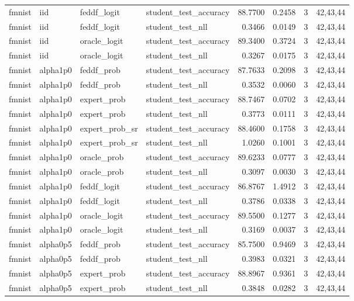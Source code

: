 \begin{tabular}{llllrrrl}
fmnist & iid & feddf\_logit & student\_test\_accuracy & 88.7700 & 0.2458 & 3 & 42,43,44 \\
fmnist & iid & feddf\_logit & student\_test\_nll & 0.3466 & 0.0149 & 3 & 42,43,44 \\
fmnist & iid & oracle\_logit & student\_test\_accuracy & 89.3400 & 0.3724 & 3 & 42,43,44 \\
fmnist & iid & oracle\_logit & student\_test\_nll & 0.3267 & 0.0175 & 3 & 42,43,44 \\
fmnist & alpha1p0 & feddf\_prob & student\_test\_accuracy & 87.7633 & 0.2098 & 3 & 42,43,44 \\
fmnist & alpha1p0 & feddf\_prob & student\_test\_nll & 0.3532 & 0.0060 & 3 & 42,43,44 \\
fmnist & alpha1p0 & expert\_prob & student\_test\_accuracy & 88.7467 & 0.0702 & 3 & 42,43,44 \\
fmnist & alpha1p0 & expert\_prob & student\_test\_nll & 0.3773 & 0.0111 & 3 & 42,43,44 \\
fmnist & alpha1p0 & expert\_prob\_sr & student\_test\_accuracy & 88.4600 & 0.1758 & 3 & 42,43,44 \\
fmnist & alpha1p0 & expert\_prob\_sr & student\_test\_nll & 1.0260 & 0.1001 & 3 & 42,43,44 \\
fmnist & alpha1p0 & oracle\_prob & student\_test\_accuracy & 89.6233 & 0.0777 & 3 & 42,43,44 \\
fmnist & alpha1p0 & oracle\_prob & student\_test\_nll & 0.3097 & 0.0030 & 3 & 42,43,44 \\
fmnist & alpha1p0 & feddf\_logit & student\_test\_accuracy & 86.8767 & 1.4912 & 3 & 42,43,44 \\
fmnist & alpha1p0 & feddf\_logit & student\_test\_nll & 0.3786 & 0.0338 & 3 & 42,43,44 \\
fmnist & alpha1p0 & oracle\_logit & student\_test\_accuracy & 89.5500 & 0.1277 & 3 & 42,43,44 \\
fmnist & alpha1p0 & oracle\_logit & student\_test\_nll & 0.3169 & 0.0037 & 3 & 42,43,44 \\
fmnist & alpha0p5 & feddf\_prob & student\_test\_accuracy & 85.7500 & 0.9469 & 3 & 42,43,44 \\
fmnist & alpha0p5 & feddf\_prob & student\_test\_nll & 0.3983 & 0.0321 & 3 & 42,43,44 \\
fmnist & alpha0p5 & expert\_prob & student\_test\_accuracy & 88.8967 & 0.9361 & 3 & 42,43,44 \\
fmnist & alpha0p5 & expert\_prob & student\_test\_nll & 0.3848 & 0.0282 & 3 & 42,43,44 \\

\end{tabular}
